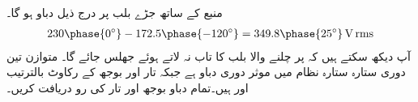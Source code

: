 منبع  کے ساتھ جڑے بلب پر درج ذیل دباو ہو گا۔
\begin{align*}
230\phase{0^{\circ}}-172.5\phase{-120^{\circ}}=349.8\phase{25^{\circ}}\,\si{\volt}\,\rms
\end{align*}
آپ دیکھ سکتے ہیں کہ  پر چلنے والا بلب  کا تاب نہ لاتے ہوئے جھلس جائے گا۔
متوازن تین دوری ستارہ ستارہ  نظام میں موثر دوری دباو  ہے جبکہ تار اور بوجھ کے رکاوٹ بالترتیب  اور   ہیں۔تمام دباو بوجھ اور تار کی رو دریافت کریں۔

